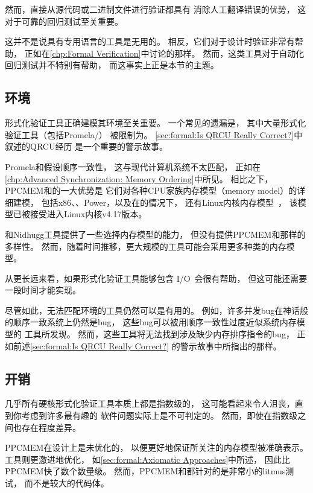 然而，直接从源代码或二进制文件进行验证都具有
消除人工翻译错误的优势，
这对于可靠的回归测试至关重要。

这并不是说具有专用语言的工具是无用的。
相反，它们对于设计时验证非常有帮助，
正如在\cref{chp:Formal Verification}中讨论的那样。
然而，这类工具对于自动化回归测试并不特别有帮助，
而这事实上正是本节的主题。

\subsection{环境}
\label{sec:future:Environment}

形式化验证工具正确建模其环境至关重要。
一个常见的遗漏是，
其中大量形式化验证工具（包括Promela/）
被限制为。
\cref{sec:formal:Is QRCU Really Correct?}中叙述的QRCU经历
是一个重要的警示故事。

Promela和假设顺序一致性，
这与现代计算机系统不太匹配，
正如在\cref{chp:Advanced Synchronization: Memory Ordering}中所见。
相比之下，PPCMEM和的一大优势是
它们对各种CPU家族内存模型（memory model）的详细建模，
包括x86、\ARM、Power，以及在的情况下，
还有Linux内核内存模型~\cite{Alglave:2018:FSC:3173162.3177156}，
该模型已被接受进入Linux内核v4.17版本。

和Nidhugg工具提供了一些选择内存模型的能力，
但没有提供PPCMEM和那样的多样性。
然而，随着时间推移，更大规模的工具可能会采用更多种类的内存模型。

从更长远来看，如果形式化验证工具能够包含
I/O~\cite{PaulEMcKenney2016LinuxKernelMMIO}会很有帮助，
但这可能还需要一段时间才能实现。

尽管如此，无法匹配环境的工具仍然可以是有用的。
例如，许多并发bug在神话般的顺序一致系统上仍然是bug，
这些bug可以被用顺序一致性过度近似系统内存模型的
工具所发现。
然而，这些工具将无法找到涉及缺少内存排序指令的bug，
正如前述\cref{sec:formal:Is QRCU Really Correct?}
的警示故事中所指出的那样。

\subsection{开销}
\label{sec:future:Overhead}

几乎所有硬核形式化验证工具本质上都是指数级的，
这可能看起来令人沮丧，直到你考虑到许多最有趣的
软件问题实际上是不可判定的。
然而，即使在指数级之间也存在程度差异。

PPCMEM在设计上是未优化的，
以便更好地保证所关注的内存模型被准确表示。
工具则更激进地优化，
如\cref{sec:formal:Axiomatic Approaches}中所述，
因此比PPCMEM快了数个数量级。
然而，PPCMEM和都针对的是非常小的litmus测试，
而不是较大的代码体。

